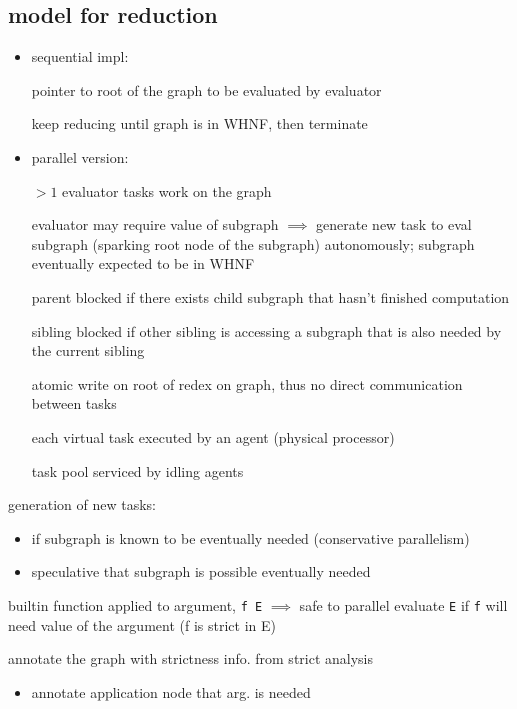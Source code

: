 \documentclass[8pt]{extarticle}
\begin{document}
\begin{multicols*}{2}
\subsection{model for reduction}
\begin{itemize}
\item sequential impl:

  pointer to root of the graph to be evaluated by evaluator

  keep reducing until graph is in WHNF, then terminate

\item parallel version:

  $>1$ evaluator tasks work on the graph

  evaluator may require value of subgraph $\implies$ generate new task to eval subgraph (sparking root node of the subgraph) autonomously; subgraph eventually expected to be in WHNF

  parent blocked if there exists child subgraph that hasn't finished computation

  sibling blocked if other sibling is accessing a subgraph that is also needed by the current sibling

  atomic write on root of redex on graph, thus no direct communication between tasks

  each virtual task executed by an agent (physical processor)

  task pool serviced by idling agents
\end{itemize}

generation of new tasks:
\begin{itemize}
\item if subgraph is known to be eventually needed (conservative parallelism)
\item speculative that subgraph is possible eventually needed
\end{itemize}

builtin function applied to argument, \verb|f E|
$\implies$ safe to parallel evaluate \verb|E| if \verb|f| will need value of the argument (f is strict in E)

annotate the graph with strictness info. from strict analysis
\begin{itemize}
\item annotate application node that arg. is needed



\end{itemize}
\end{multicols*}
\end{document}
